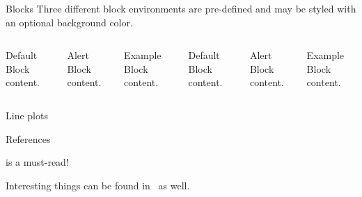 \begin{frame}{Blocks}
	Three different block environments are pre-defined and may be styled with an
	optional background color.
	
	\begin{columns}[T,onlytextwidth]
		\begin{block}{Default}
			Block content.
		\end{block}
		
		\begin{alertblock}{Alert}
			Block content.
		\end{alertblock}
		
		\begin{exampleblock}{Example}
			Block content.
		\end{exampleblock}
		
		
		
		\begin{block}{Default}
			Block content.
		\end{block}
		
		\begin{alertblock}{Alert}
			Block content.
		\end{alertblock}
		
		\begin{exampleblock}{Example}
			Block content.
		\end{exampleblock}
		
	\end{columns}
\end{frame}
\begin{frame}{Line plots}
	\begin{figure}
	\end{figure}
\end{frame}

\begin{frame}{References}

 is a must-read!

Interesting things can be found in~ as well.

\end{frame}

